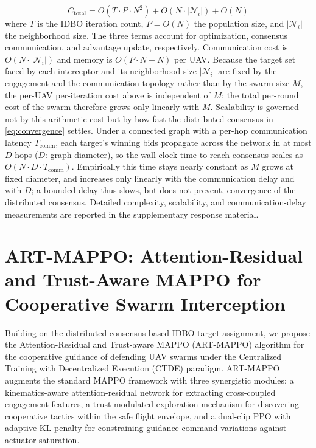 \documentclass[lettersize,journal]{IEEEtran}
\newcommand{\hladd}[1]{{\color{blue}#1}}
\begin{document}
\begin{equation}
\label{eq:complexity}
C_{\text{total}} = O(T \cdot P \cdot N^2) + O(N \cdot |\mathcal{N}_i|) + O(N)
\end{equation}
where $T$ is the IDBO iteration count, $P = O(N)$ the population size, and $|\mathcal{N}_i|$ the neighborhood size. The three terms account for optimization, consensus communication, and advantage update, respectively. Communication cost is $O(N \cdot |\mathcal{N}_i|)$ and memory is $O(P \cdot N + N)$ per UAV. \hladd{Because the target set faced by each interceptor and its neighborhood size $|\mathcal{N}_i|$ are fixed by the engagement and the communication topology rather than by the swarm size $M$, the per-UAV per-iteration cost above is independent of $M$; the total per-round cost of the swarm therefore grows only linearly with $M$. Scalability is governed not by this arithmetic cost but by how fast the distributed consensus in \eqref{eq:convergence} settles. Under a connected graph with a per-hop communication latency $T_{\mathrm{comm}}$, each target's winning bids propagate across the network in at most $D$ hops ($D$: graph diameter), so the wall-clock time to reach consensus scales as $O(N\!\cdot\!D\!\cdot\!T_{\mathrm{comm}})$. Empirically this time stays nearly constant as $M$ grows at fixed diameter, and increases only linearly with the communication delay and with $D$; a bounded delay thus slows, but does not prevent, convergence of the distributed consensus. Detailed complexity, scalability, and communication-delay measurements are reported in the supplementary response material.}













\section{ART-MAPPO: Attention-Residual and Trust-Aware MAPPO for Cooperative Swarm Interception}
\label{sec:cooperative_algorithm}

Building on the distributed consensus-based IDBO target assignment, we propose the Attention-Residual and Trust-aware MAPPO (ART-MAPPO) algorithm for the cooperative guidance of defending UAV swarms under the Centralized Training with Decentralized Execution (CTDE) paradigm. ART-MAPPO augments the standard MAPPO framework with three synergistic modules: a kinematics-aware attention-residual network for extracting cross-coupled engagement features, a trust-modulated exploration mechanism for discovering cooperative tactics within the safe flight envelope, and a dual-clip PPO with adaptive KL penalty for constraining guidance command variations against actuator saturation.
\end{document}
